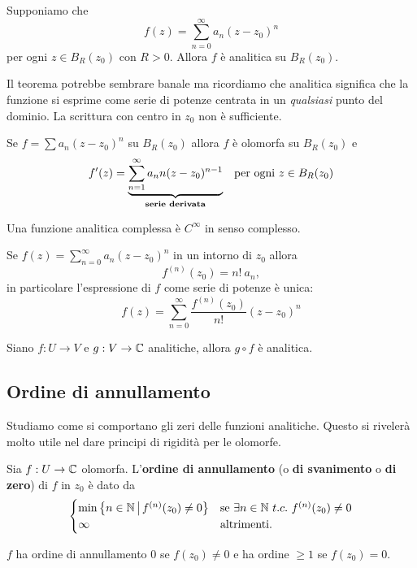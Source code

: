 \begin{multicols*}{2}
\begin{theorem}\label{SeriePotenzeSonoAnalitiche}
Supponiamo che
\[f(z)=\sum_{n=0}^\infty a_n(z-z_0)^n\]
per ogni $z\in B_R(z_0)$ con $R>0$. Allora $f$ \`e analitica su $B_R(z_0)$.
\end{theorem}
\begin{remark}
Il teorema potrebbe sembrare banale ma ricordiamo che analitica significa che la funzione si esprime come serie di potenze centrata in un \textit{qualsiasi} punto del dominio. La scrittura con centro in $z_0$ non \`e sufficiente.
\end{remark}

\begin{theorem}\label{DerivataSerieDiPotenze}
Se $f=\sum a_n(z-z_0)^n$ su $B_R(z_0)$ allora $f$ \`e olomorfa su $B_R(z_0)$ e
\[f'(z)=\underset{\text{\textbf{serie derivata}}}{\underbrace{\sum_{n=1}^\infty a_nn(z-z_0)^{n-1}}}\quad \text{per ogni $z\in B_R(z_0)$}\]
\end{theorem}
\begin{corollary}\label{AnaliticaImplicaOlomorfa}
Una funzione analitica complessa \`e $C^\infty$ in senso complesso.
\end{corollary}
\begin{corollary}\label{TaylorSerieDiPotenze}
Se $f(z)=\sum_{n=0}^\infty a_n(z-z_0)^n$ in un intorno di $z_0$ allora
\[f^{(n)}(z_0)=n!\ a_n,\]
in particolare l'espressione di $f$ come serie di potenze \`e unica:
\[f(z)=\sum_{n=0}^\infty \frac{f^{(n)}(z_0)}{n!}(z-z_0)^n\]
\end{corollary}

\begin{remark}\label{ComposizioneAnaliticheEAnalitica}
Siano $f:U\to V$ e $g:V\to \mathbb{C}$ analitiche, allora $g\circ f$ \`e analitica.
\end{remark}



\subsection{Ordine di annullamento}
Studiamo come si comportano gli zeri delle funzioni analitiche. Questo si riveler\`a molto utile nel dare principi di rigidit\`a per le olomorfe.

\begin{definition}
Sia $f:U\to \mathbb{C}$ olomorfa. L'\textbf{ordine di annullamento} (o \textbf{di svanimento} o \textbf{di zero}) di $f$ in $z_0$ \`e dato da
\[\begin{cases}
\min\cpa{n\in\N\sep
f^{(n)}(z_0)\neq 0} & \text{se }\exists n\in\N\ t.c.\ f^{(n)}(z_0)\neq 0\\
\infty &\text{altrimenti.}
\end{cases}\]
\end{definition}
\begin{remark}
$f$ ha ordine di annullamento $0$ se $f(z_0)\neq 0$ e ha ordine $\geq 1$ se $f(z_0)=0$.
\end{remark}


\end{multicols*}
